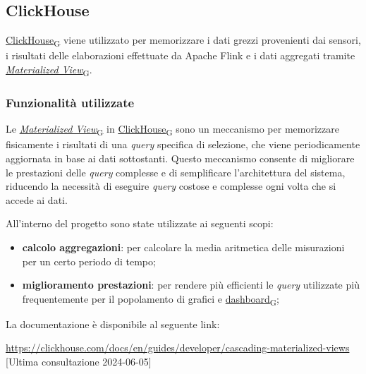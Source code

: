 \subsection{ClickHouse}
\href{https://7last.github.io/docs/pb/documentazione-interna/glossario\#clickhouse}{ClickHouse\textsubscript{G}} viene utilizzato per memorizzare i dati grezzi provenienti dai sensori, i risultati delle elaborazioni effettuate da Apache Flink e i dati aggregati tramite
\href{https://7last.github.io/docs/pb/documentazione-interna/glossario\#materialized-view}{\textit{Materialized View}\textsubscript{G}}.\\

\subsubsection{Funzionalità utilizzate}
Le \href{https://7last.github.io/docs/pb/documentazione-interna/glossario\#materialized-view}{\textit{Materialized View}\textsubscript{G}} in \href{https://7last.github.io/docs/pb/documentazione-interna/glossario\#clickhouse}{ClickHouse\textsubscript{G}} sono un meccanismo per memorizzare fisicamente i risultati di una \textit{query} specifica di selezione,
che viene periodicamente aggiornata in base ai dati sottostanti. Questo meccanismo consente di migliorare le prestazioni delle \textit{query} complesse
e di semplificare l'architettura del sistema, riducendo la necessità di eseguire \textit{query} costose e complesse ogni volta che si accede ai dati.

All'interno del progetto sono state utilizzate ai seguenti scopi:
\begin{itemize}
	\item \textbf{calcolo aggregazioni}: per calcolare la media aritmetica delle misurazioni per un certo periodo di tempo;
	\item \textbf{miglioramento prestazioni}: per rendere più efficienti le \textit{query} utilizzate più frequentemente per il popolamento di grafici e \href{https://7last.github.io/docs/pb/documentazione-interna/glossario\#dashboard}{dashboard\textsubscript{G}};
\end{itemize}

La documentazione è disponibile al seguente link:
\begin{center}
	\url{https://clickhouse.com/docs/en/guides/developer/cascading-materialized-views} [Ultima consultazione 2024-06-05]
\end{center}

